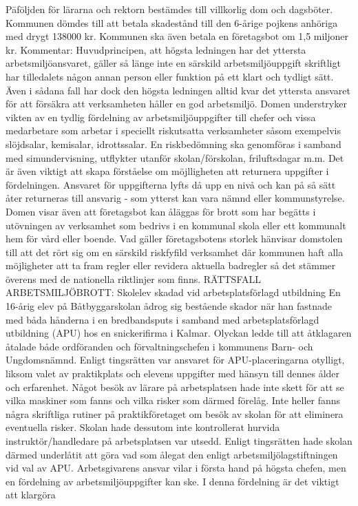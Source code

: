 Pāföljden för lärarna och rektorn bestämdes till villkorlig dom och dagsböter. Kommunen dömdes till att betala skadestånd till den 6-årige pojkens anhöriga med drygt 138000 kr. Kommunen ska även betala en företagsbot om 1,5 miljoner kr.
Kommentar: Huvudprincipen, att högsta ledningen har det yttersta arbetsmiljöansvaret, gäller så länge inte en särskild arbetsmiljöuppgift skriftligt har tilledalets någon annan person eller funktion på ett klart och tydligt sätt. Även i sådana fall har dock den högsta ledningen alltid kvar det yttersta ansvaret för att försäkra att verksamheten håller en god arbetsmiljö.
Domen understryker vikten av en tydlig fördelning av arbetsmiljöuppgifter till chefer och vissa medarbetare som arbetar i speciellt riskutsatta verksamheter såsom exempelvis slöjdsalar, kemisalar, idrottssalar. En riskbedömning ska genomföras i samband med simundervisning, utflykter utanför skolan/förskolan, friluftsdagar m.m. Det är även viktigt att skapa förståelse om möjlligheten att returnera uppgifter i fördelningen. Ansvaret för uppgifterna lyfts då upp en nivå och kan på så sätt åter returneras till ansvarig - som ytterst kan vara nämnd eller kommunstyrelse.
Domen visar även att företagsbot kan åläggas för brott som har begätts i utövningen av verksamhet som bedrivs i en kommunal skola eller ett kommunalt hem för vård eller boende. Vad gäller företagsbotens storlek hänvisar domstolen till att det rört sig om en särskild riskfyfild verksamhet där kommunen haft alla möjligheter att ta fram regler eller revidera aktuella badregler så det stämmer överens med de nationella riktlinjer som finns.
RÄTTSFALL ARBETSMILJÖBROTT: Skolelev skadad vid arbetsplatsförlagd utbildning
En 16-årig elev på Båtbyggarskolan ådrog sig bestående skador när han fastnade med båda hånderna i en bredbandsputs i samband med arbetsplatsförlagd utbildning (APU) hos en snickerifirma i Kalmar. Olyckan ledde till att åtklagaren åtalade både ordföranden och förvaltningschefen i kommunens Barn- och Ungdomsnämnd.
Enligt tingsrätten var ansvaret för APU-placeringarna otylligt, liksom valet av praktikplats och elevens uppgifter med hänsyn till dennes ålder och erfarenhet. Något besök av lärare på arbetsplatsen hade inte skett för att se vilka maskiner som fanns och vilka risker som därmed förelåg. Inte heller fanns några skriftliga rutiner på praktikföretaget om besök av skolan för att eliminera eventuella risker. Skolan hade dessutom inte kontrollerat hurvida instruktör/handledare på arbetsplatsen var utsedd. Enligt tingsrätten hade skolan därmed underlåtit att göra vad som ålegat den enligt arbetsmiljölagstiftningen vid val av APU.
Arbetsgivarens ansvar vilar i första hand på högsta chefen, men en fördelning av arbetsmiljöuppgifter kan ske. I denna fördelning är det viktigt att klargöra

